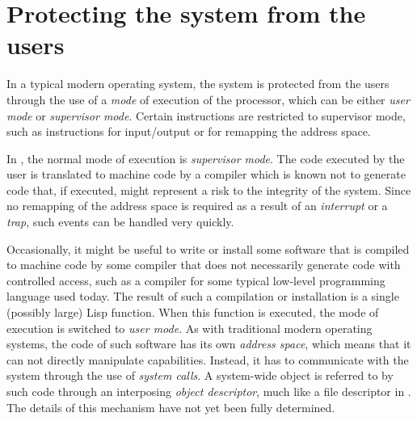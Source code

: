 \section{Protecting the system from the users}

In a typical modern operating system, the system is protected from the
users through the use of a \emph{mode} of execution of the processor,
which can be either \emph{user mode} or \emph{supervisor mode}.
Certain instructions are restricted to supervisor mode, such as
instructions for input/output or for remapping the address space. 

In \sysname{}, the normal mode of execution is \emph{supervisor mode}.
The code executed by the user is translated to machine code by a
compiler which is known not to generate code that, if executed, might
represent a risk to the integrity of the system.  Since no remapping
of the address space is required as a result of an \emph{interrupt} or
a \emph{trap}, such events can be handled very quickly.

Occasionally, it might be useful to write or install some software
that is compiled to machine code by some compiler that does not
necessarily generate code with controlled access, such as a compiler
for some typical low-level programming language used today.  The
result of such a compilation or installation is a single (possibly
large) Lisp function.  When this function is executed, the mode of
execution is switched to \emph{user mode}.  As with traditional modern
operating systems, the code of such software has its own \emph{address
  space}, which means that it can not directly manipulate \sysname{}
capabilities.  Instead, it has to communicate with the system through
the use of \emph{system calls}.  A system-wide object is referred to
by such code through an interposing \emph{object descriptor}, much
like a file descriptor in \unix{}.  The details of this mechanism have
not yet been fully determined.



